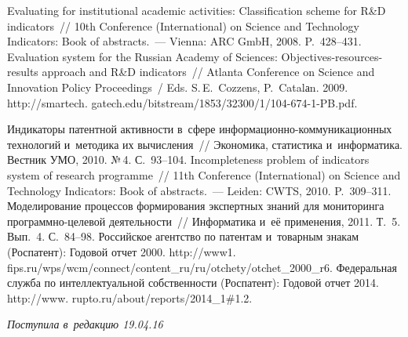 \begin{multicols}{2}
{{\begin{thebibliography}{99}
 Evaluating for institutional academic activities: Classification 
scheme for R\&D indicators~// 10th Conference (International) on Science and Technology 
Indicators: Book of abstracts.~--- Vienna: ARC GmbH, 2008. P.~428--431.
 Evaluation system for the Russian Academy of Sciences: 
Objectives-resources-results approach and R\&D indicators~// Atlanta Conference on Science 
and Innovation Policy Proceedings~/ Eds. S.\,E.~Cozzens, P.~Catalаn. 2009. {\sf 
http://smartech. gatech.edu/bitstream/1853/32300/1/104-674-1-PB.pdf}.

 Индикаторы патентной активности 
в~сфере ин\-фор\-ма\-ци\-он\-но-ком\-му\-ни\-ка\-ци\-он\-ных технологий и~методика их вычисления~// 
Экономика, статистика и~информатика. Вестник УМО, 2010. №\,4. С.~93--104.
 Incompleteness problem of indicators system of research 
programme~// 11th Conference (International) on Science and Technology Indicators: 
Book of abstracts.~--- Leiden: CWTS, 2010. P.~309--311.
 Моделирование процессов формирования экспертных 
знаний для мониторинга программно-целевой деятельности~// Информатика и~её 
применения, 2011. Т.~5. Вып.~4. С.~84--98.
Российское агентство по патентам и~товарным знакам (Роспатент): Годовой отчет 2000. 
{\sf http://www1. fips.ru/wps/wcm/connect/content\_ru/ru/otchety/\linebreak otchet\_2000\_r6}.
Федеральная служба по интеллектуальной собственности (Роспатент): Годовой отчет 2014. 
{\sf http://www. rupto.ru/about/reports/2014\_1\#1.2}.

\end{thebibliography}

 }
 }

\end{multicols}

\vspace*{-3pt}

\hfill{\small\textit{Поступила в~редакцию 19.04.16}}


\newpage

\vspace*{-24pt}



